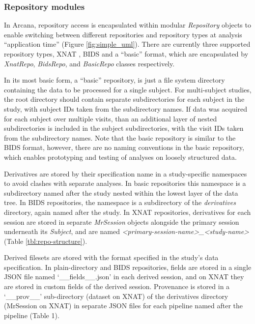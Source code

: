 \documentclass[smallextended]{svjour3}       %
\begin{document}
\subsubsection*{Repository modules}\label{repository-modules}

In Arcana, repository access is encapsulated within modular
\emph{Repository} objects to enable switching between different
repositories and repository types at analysis ``application time''
(Figure \ref{fig:simple_uml}). There are currently three supported repository types, XNAT
\citep{marcus_extensible_2007}, BIDS \citep{gorgolewski_brain_2016} and a
``basic'' format, which are encapsulated by \emph{XnatRepo},
\emph{BidsRepo}, and \emph{BasicRepo} classes
respectively.

In its most basic form, a ``basic'' repository, is just a file system
directory containing the data to be processed for a single subject.
For multi-subject studies, the root directory should contain separate
subdirectories for each subject in the study, with subject IDs taken
from the subdirectory names. If data was acquired for each subject
over multiple visits, than an additional layer of nested subdirectories
is included in the subject subdirectories, with the visit IDs taken from
the subdirectory names. Note that the basic
repository is similar to the BIDS format, however, there are no naming
conventions in the basic repository, which enables prototyping and
testing of analyses on loosely structured data.

Derivatives are stored by their specification name in a study-specific
namespaces to avoid clashes with separate analyses. In basic
repositories this namespace is a subdirectory named after the study
nested within the lowest layer of the data tree. In BIDS repositories, the namespace is a subdirectory of the
\emph{derivatives} directory, again named after the study. In XNAT
repositories, derivatives for each session are stored in separate
\emph{MrSession} objects alongside the primary session underneath its
\emph{Subject}, and are named
\emph{\textless{}primary-session-name\textgreater{}\_\textless{}study-name\textgreater{}}
(Table \ref{tbl:repo-structure}).

Derived filesets are stored with the format specified in the study's
data specification. In plain-directory and BIDS repositories, fields are
stored in a single JSON file named `\_\_fields\_\_.json' in each derived
session, and on XNAT they are stored in custom fields of the derived
session. Provenance is stored in a `\_\_prov\_\_' sub-directory (dataset
on XNAT) of the derivatives directory (MrSession on XNAT) in separate
JSON files for each pipeline named after the pipeline (Table 1).
\end{document}
